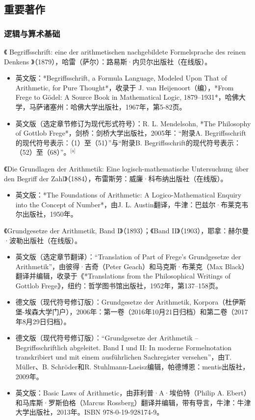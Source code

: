 \subsection{重要著作}  
\subsubsection{逻辑与算术基础} 
《 Begriffsschrift: eine der arithmetischen nachgebildete Formelsprache des reinen Denkens 》（1879），哈雷（萨尔）：路易斯·内贝尔出版社（在线版）。
\begin{itemize}
\item 英文版：*Begriffsschrift, a Formula Language, Modeled Upon That of Arithmetic, for Pure Thought*，收录于 J. van Heijenoort（编），*From Frege to Gödel: A Source Book in Mathematical Logic, 1879–1931*，哈佛大学，马萨诸塞州：哈佛大学出版社，1967年，第5-82页。  
\item 英文版（选定章节修订为现代形式符号）：R. L. Mendelsohn, *The Philosophy of Gottlob Frege*，剑桥：剑桥大学出版社，2005年：“附录A. Begriffsschrift的现代符号表示：（1）至（51）”与“附录B. Begriffsschrift的现代符号表示：（52）至（68）”。\(^\text{[a]}\)
\end{itemize}
《Die Grundlagen der Arithmetik: Eine logisch-mathematische Untersuchung über den Begriff der Zahl》（1884），布雷斯劳：威廉·科布纳出版社（在线版）。
\begin{itemize}
\item 英文版：*The Foundations of Arithmetic: A Logico-Mathematical Enquiry into the Concept of Number*，由J. L. Austin翻译，牛津：巴兹尔·布莱克韦尔出版社，1950年。
\end{itemize}
《Grundgesetze der Arithmetik, Band I》（1893）；《Band II》（1903），耶拿：赫尔曼·波勒出版社（在线版）。
\begin{itemize}
\item 英文版（选定章节翻译）：“Translation of Part of Frege's Grundgesetze der Arithmetik”，由彼得·吉奇（Peter Geach）和马克斯·布莱克（Max Black）翻译并编辑，收录于《*Translations from the Philosophical Writings of Gottlob Frege》，纽约：哲学图书馆出版社，1952年，第137–158页。  
\item 德文版（现代符号修订版）：Grundgesetze der Arithmetik, Korpora（杜伊斯堡-埃森大学门户），2006年：第一卷（2016年10月21日归档）和第二卷（2017年8月29日归档）。  
\item 德文版（现代符号修订版）：“Grundgesetze der Arithmetik – Begriffsschriftlich abgeleitet. Band I und II: In moderne Formelnotation transkribiert und mit einem ausführlichen Sachregister versehen”，由T. Müller、B. Schröder和R. Stuhlmann-Laeisz编辑，帕德博恩：mentis出版社，2009年。  
\item 英文版：Basic Laws of Arithmetic，由菲利普·A·埃伯特（Philip A. Ebert）和马库斯·罗斯伯格（Marcus Rossberg）翻译并编辑，带有导言，牛津：牛津大学出版社，2013年。ISBN 978-0-19-928174-9。
\end{itemize}
